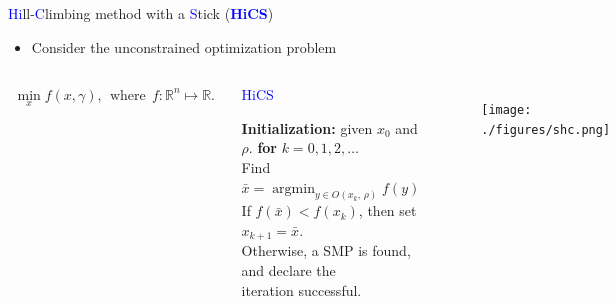\documentclass{beamer}
\DeclareMathOperator*{\argmin}{\mathrm{argmin}}
\begin{document}
\begin{frame}{\textcolor{blue}{Hi}ll-\textcolor{blue}{C}limbing
	method with a \textcolor{blue}{S}tick
	(\textcolor{blue}{\textbf{HiCS}})}

\begin{itemize}
	\item Consider the unconstrained optimization problem
\end{itemize}
\vspace{-0.3cm}
\begin{columns}[c]
	\column{8cm}
\begin{align*}
	\min_x f(x,\gamma),~~ \mbox{where}~~
f: \mathbb{R}^n \mapsto \mathbb{R}.
\end{align*}
{\scriptsize
\begin{algorithm}[H]
	\caption{\textcolor{blue}{HiCS}}
	\label{alg:shc}
\begin{algorithmic}[1]
	\STATE \textbf{Initialization:} given $x_0$ and $\rho$.
	\STATE \textbf{for} $k=0,1,2,\dots$
	\\
	\hspace{0.2cm} Find $\bar{x}=\argmin_{y\in O(x_k,\,\rho)} f(y)$
			\\
	\hspace{0.2cm} If $f(\bar x)<f(x_k)$, then set $x_{k+1}= \bar{x}$.
		  \\
		   \hspace{0.2cm} Otherwise, a SMP is found, and declare the
		   \\
		   \hspace{0.2cm}
		   iteration successful.
\end{algorithmic}
\end{algorithm}
}
	\column{3.5cm}
\begin{figure}[!htbp]
	\centering
	  \texttt{[image: ./figures/shc.png]}
\end{figure}
\end{columns}

\end{frame}
\end{document}

